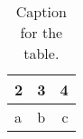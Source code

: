 \documentclass{article}
\begin{document}
\begin{table}[h!]
  \begin{center}
    \caption{Caption for the table.}
    \label{tab:table1}
    \begin{tabular}{l|c||r}
     2&3 & 4\\
      \hline
      a & b & c\\
    \end{tabular}
  \end{center}
\end{table}
\end{document}

